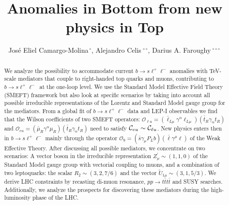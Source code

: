 \documentclass[aps,twocolumn,showpacs,preprintnumbers,amsmath,amssymb,floatfix,nofootinbib]{revtex4-1}
\newcommand{\C}{{\cal C}}
\begin{document}



\title{Anomalies in Bottom from new physics in Top}


\author{Jos\'e Eliel Camargo-Molina${}^{\,\circ}$, Alejandro Celis${}^{\,\circ\circ}$, Darius A. Faroughy${}^{\,\circ\circ\circ}$ \vspace{0.3cm}}



   
   
   



%
\begin{abstract}

We analyze the possibility to accommodate current $b \to s \ell^+ \ell^-$ anomalies with TeV-scale mediators that couple to right-handed top quarks and muons, contributing to $b \to s \ell^+ \ell^-\,$ at the one-loop level. We use the Standard Model Effective Field Theory (SMEFT) framework but also look at specific scenarios by taking into account all possible irreducible representations of the Lorentz and Standard Model gauge group for the mediators.    From a global fit of $b \to s \ell^+ \ell^-$ data and LEP-I observables we find that the Wilson coefficients of two SMEFT operators: $\mathcal{O}_{\ell u}= (\bar \ell_{ L \mu} \gamma^{\alpha}  \ell_{ L \mu}) (\bar t_R \gamma_{\alpha}  t_R  )$ and  $\mathcal{O}_{e u}=  (\bar \mu_{R} \gamma^{\alpha}  \mu_{R})  (\bar t_R \gamma_{\alpha}  t_R  )$ need to satisfy $\C_{eu} \sim \C_{\ell u}$. New physics enters then in $b \to s \ell^+ \ell^-$ mainly through the operator $\mathcal{O}_9 = (   \bar s  \gamma_{\mu}   P_{L}   b   )( \bar \ell \gamma^{\mu} \ell )$ of the Weak Effective Theory.  After discussing all possible mediators, we concentrate on two scenarios:   A vector boson in the irreducible representation $Z_{\mu}^{\prime} \sim (1,1,0)$ of the Standard Model gauge group with vectorial coupling to muons, and a combination of two leptoquarks: the scalar $R_2 \sim (3,2,7/6)$ and the vector $\widetilde U_{1 \mu} \sim (3,1,5/3)$. We derive LHC constraints by recasting di-muon resonance, $pp \to t \bar t t \bar t$ and SUSY searches.  Additionally, we analyze the prospects for discovering these mediators during the high-luminosity phase of the LHC.   
\end{abstract}
\end{document}
